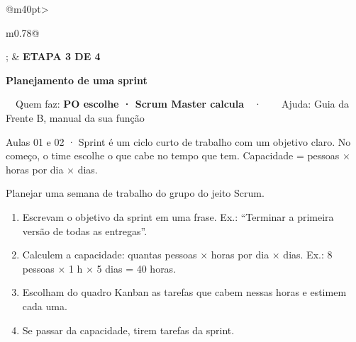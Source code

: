 \documentclass[11pt,a4paper]{article}
\newcommand{\rotulo}[2]{\Needspace{6\baselineskip}\vspace{10pt}%
  \noindent{\color{cor}\normalsize #1}\hspace{6pt}{\footnotesize\bfseries\color{cor}\MakeUppercase{#2}}\par\vspace{2pt}}
\newcommand{\anotacoes}{\par\ifdim\dimexpr\pagegoal-\pagetotal\relax>3.5cm\ifdim\pagegoal<\maxdimen
\begin{tcolorbox}[enhanced,height fill,colback=white,colframe=cor!35,boxrule=0.8pt,arc=8pt,before skip=10pt,left=10pt,top=6pt,
  borderline={0.8pt}{0pt}{cor!35,dashed},frame hidden,
  underlay={\begin{scope}\clip(interior.south west)rectangle(interior.north east);
    \foreach \y in {1,...,40}{\draw[cor!18,line width=0.6pt]([yshift=-\y*0.75cm-0.5cm]interior.north west)--([yshift=-\y*0.75cm-0.5cm]interior.north east);}\end{scope}}]
{\footnotesize\bfseries\color{cor}\faStickyNote\ \ ANOTAÇÕES}
\end{tcolorbox}\fi\fi}
\newif\ifjaanotou
\newcommand{\usarblocofinal}{\par\global\jaanotoufalse
  \ifdim\pagegoal<\maxdimen\ifdim\dimexpr\pagegoal-\pagetotal\relax<\dimexpr\ht\blocofinal+\dp\blocofinal+18pt\relax
    \anotacoes\global\jaanotoutrue\clearpage\fi\fi
  \vspace{10pt}\noindent\usebox{\blocofinal}\par}
\begin{document}
\usarblocofinal
\ifjaanotou\else\anotacoes\fi
\clearpage
\noindent{}
\par\vspace{8pt}
\begin{faixa}[before skip=0pt]
\begin{tabular}{@{}m{40pt}>{\raggedright\arraybackslash}m{0.78\linewidth}@{}}
\tikz\node[circle,fill=white,text=cor,minimum size=36pt,inner sep=0pt]{\Large \faRunning}; &
{\footnotesize\bfseries ETAPA 3 DE 4}\ \ \ \par\vspace{2pt}
{\fontsize{17}{21}\selectfont\bfseries Planejamento de uma sprint}\par\vspace{3pt}
{\footnotesize\faUser\ \ Quem faz: \textbf{PO escolhe · Scrum Master calcula}\ \ ·\ \ \faCompass\ \ Ajuda: Guia da Frente B, manual da sua função}
\end{tabular}
\end{faixa}
\begin{apostila}\vspace{4pt}Aulas 01 e 02 · Sprint é um ciclo curto de trabalho com um objetivo claro. No começo, o time escolhe o que cabe no tempo que tem. Capacidade = pessoas × horas por dia × dias.\end{apostila}
\rotulo{\faBullseye}{Objetivo}
{\large Planejar uma semana de trabalho do grupo do jeito Scrum.}\par
\rotulo{\faShoePrints}{Passo a passo}
\begin{enumerate}
  \item Escrevam o objetivo da sprint em uma frase. Ex.: ``Terminar a primeira versão de todas as entregas''.
  \item Calculem a capacidade: quantas pessoas × horas por dia × dias. Ex.: 8 pessoas × 1 h × 5 dias = 40 horas.
  \item Escolham do quadro Kanban as tarefas que cabem nessas horas e estimem cada uma.
  \item Se passar da capacidade, tirem tarefas da sprint.
\end{enumerate}
\end{document}
